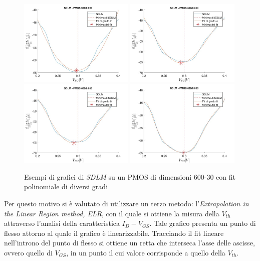 \documentclass[12pt, letterpaper]{book}
\begin{document}
\begin{figure}[h!]
  \centering
  \includegraphics[width=0.49\textwidth]{SDLM-P1-600-30-grado2}
  \includegraphics[width=0.49\textwidth]{SDLM-P1-600-30-grado4}
  \includegraphics[width=0.49\textwidth]{SDLM-P1-600-30-grado6}
  \includegraphics[width=0.49\textwidth]{SDLM-P1-600-30-grado8}
  \caption{Esempi di grafici di \emph{SDLM} su un PMOS di dimensioni 600-30 con fit polinomiale di diversi gradi}
\end{figure}



Per questo motivo si è valutato di utilizzare un terzo metodo: l'\emph{Extrapolation in the Linear Region method, ELR}, con il quale si ottiene la misura della $V_{th}$ attraverso l'analisi della caratteristica $I_D-V_{GS}$.  Tale grafico presenta un punto di flesso attorno al quale il grafico è linearizzabile. Tracciando il fit lineare nell'introno del punto di flesso si ottiene un retta che interseca l'asse delle ascisse, ovvero quello di $V_{GS}$, in un punto il cui valore corrisponde a quello della $V_{th}$.\\
\end{document}
